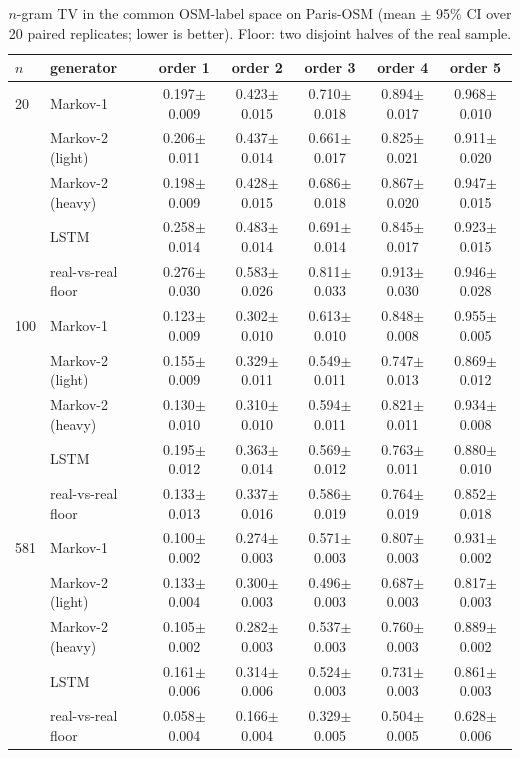 \begin{table}[!t]
\caption{$n$-gram TV in the common OSM-label space on Paris-OSM (mean $\pm$ 95\% CI over 20 paired replicates; lower is better). Floor: two disjoint halves of the real sample.}
\label{tab:supp-rq3-ngrams}
\centering\small
\begin{tabular}{llccccc}
\toprule
$n$ & generator & order 1 & order 2 & order 3 & order 4 & order 5 \\
\midrule
20 & Markov-1 & 0.197$\pm$0.009 & 0.423$\pm$0.015 & 0.710$\pm$0.018 & 0.894$\pm$0.017 & 0.968$\pm$0.010 \\
 & Markov-2 (light) & 0.206$\pm$0.011 & 0.437$\pm$0.014 & 0.661$\pm$0.017 & 0.825$\pm$0.021 & 0.911$\pm$0.020 \\
 & Markov-2 (heavy) & 0.198$\pm$0.009 & 0.428$\pm$0.015 & 0.686$\pm$0.018 & 0.867$\pm$0.020 & 0.947$\pm$0.015 \\
 & LSTM & 0.258$\pm$0.014 & 0.483$\pm$0.014 & 0.691$\pm$0.014 & 0.845$\pm$0.017 & 0.923$\pm$0.015 \\
 & real-vs-real floor & 0.276$\pm$0.030 & 0.583$\pm$0.026 & 0.811$\pm$0.033 & 0.913$\pm$0.030 & 0.946$\pm$0.028 \\
\midrule
100 & Markov-1 & 0.123$\pm$0.009 & 0.302$\pm$0.010 & 0.613$\pm$0.010 & 0.848$\pm$0.008 & 0.955$\pm$0.005 \\
 & Markov-2 (light) & 0.155$\pm$0.009 & 0.329$\pm$0.011 & 0.549$\pm$0.011 & 0.747$\pm$0.013 & 0.869$\pm$0.012 \\
 & Markov-2 (heavy) & 0.130$\pm$0.010 & 0.310$\pm$0.010 & 0.594$\pm$0.011 & 0.821$\pm$0.011 & 0.934$\pm$0.008 \\
 & LSTM & 0.195$\pm$0.012 & 0.363$\pm$0.014 & 0.569$\pm$0.012 & 0.763$\pm$0.011 & 0.880$\pm$0.010 \\
 & real-vs-real floor & 0.133$\pm$0.013 & 0.337$\pm$0.016 & 0.586$\pm$0.019 & 0.764$\pm$0.019 & 0.852$\pm$0.018 \\
\midrule
581 & Markov-1 & 0.100$\pm$0.002 & 0.274$\pm$0.003 & 0.571$\pm$0.003 & 0.807$\pm$0.003 & 0.931$\pm$0.002 \\
 & Markov-2 (light) & 0.133$\pm$0.004 & 0.300$\pm$0.003 & 0.496$\pm$0.003 & 0.687$\pm$0.003 & 0.817$\pm$0.003 \\
 & Markov-2 (heavy) & 0.105$\pm$0.002 & 0.282$\pm$0.003 & 0.537$\pm$0.003 & 0.760$\pm$0.003 & 0.889$\pm$0.002 \\
 & LSTM & 0.161$\pm$0.006 & 0.314$\pm$0.006 & 0.524$\pm$0.003 & 0.731$\pm$0.003 & 0.861$\pm$0.003 \\
 & real-vs-real floor & 0.058$\pm$0.004 & 0.166$\pm$0.004 & 0.329$\pm$0.005 & 0.504$\pm$0.005 & 0.628$\pm$0.006 \\
\bottomrule
\end{tabular}
\end{table}

